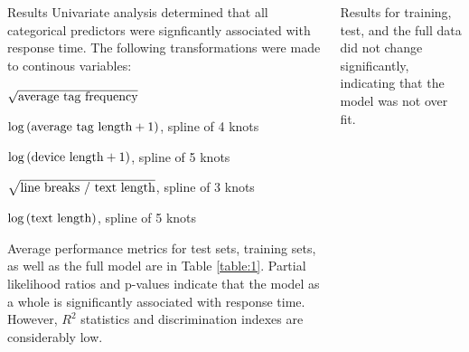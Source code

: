 \documentclass[final]{beamer}
\newlength{\onecolwid}
\newlength{\twocolwid}
\begin{document}
\begin{frame}[t]
\begin{columns}[t]
\begin{column}{\twocolwid}
\begin{columns}[t,totalwidth=\twocolwid]
\begin{column}{\onecolwid}
\begin{block}{Results}
Univariate analysis determined that all categorical predictors were signficantly associated with response time. The following transformations were made to continous variables: 

\textcolor{dblue!70}{} $\sqrt{\textnormal{average tag frequency}}$

\textcolor{dblue!70}{} $\log\left({\textnormal{average tag length} + 1}\right)$, spline of 4 knots

\textcolor{dblue!70}{} $\log\left({\textnormal{device length} + 1}\right)$, spline of 5 knots

\textcolor{dblue!70}{} $\sqrt{\textnormal{line breaks / text length}}$, spline of 3 knots

\textcolor{dblue!70}{} $\log\left({\textnormal{text length}}\right)$, spline of 5 knots

Average performance metrics for test sets, training sets, as well as the full model are in Table \ref{table:1}. Partial likelihood ratios and p-values indicate that the model as a whole is significantly associated with response time. However, $R^2$ statistics and discrimination indexes are considerably low.

\end{block}



\end{column} %

\begin{column}{\onecolwid}\vspace{-.6in} %





\begin{block}

Results for training, test, and the full data did not change significantly, indicating that the model was not over fit. 


\end{block}
\end{column}
\end{columns}
\end{column}
\end{columns}
\end{frame}
\end{document}
